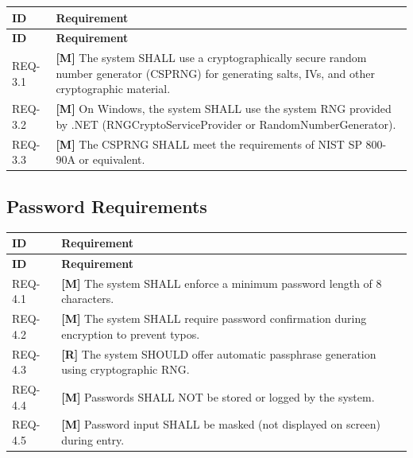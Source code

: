 \documentclass[11pt,letterpaper]{article}
\begin{document}
\begin{longtable}{@{}p{1.2cm}p{12cm}@{}}
\toprule
\textbf{ID} & \textbf{Requirement} \\
\midrule
\endfirsthead
\toprule
\textbf{ID} & \textbf{Requirement} \\
\midrule
\endhead

REQ-3.1 & \textcolor{mandatory}{\textbf{[M]}} The system SHALL use a cryptographically secure random number generator (CSPRNG) for generating salts, IVs, and other cryptographic material. \\[6pt]

REQ-3.2 & \textcolor{mandatory}{\textbf{[M]}} On Windows, the system SHALL use the system RNG provided by .NET (RNGCryptoServiceProvider or RandomNumberGenerator). \\[6pt]

REQ-3.3 & \textcolor{mandatory}{\textbf{[M]}} The CSPRNG SHALL meet the requirements of NIST SP 800-90A or equivalent. \\[6pt]

\bottomrule
\end{longtable}

\subsection{Password Requirements}

\begin{longtable}{@{}p{1.2cm}p{12cm}@{}}
\toprule
\textbf{ID} & \textbf{Requirement} \\
\midrule
\endfirsthead
\toprule
\textbf{ID} & \textbf{Requirement} \\
\midrule
\endhead

REQ-4.1 & \textcolor{mandatory}{\textbf{[M]}} The system SHALL enforce a minimum password length of 8 characters. \\[6pt]

REQ-4.2 & \textcolor{mandatory}{\textbf{[M]}} The system SHALL require password confirmation during encryption to prevent typos. \\[6pt]

REQ-4.3 & \textcolor{recommended}{\textbf{[R]}} The system SHOULD offer automatic passphrase generation using cryptographic RNG. \\[6pt]

REQ-4.4 & \textcolor{mandatory}{\textbf{[M]}} Passwords SHALL NOT be stored or logged by the system. \\[6pt]

REQ-4.5 & \textcolor{mandatory}{\textbf{[M]}} Password input SHALL be masked (not displayed on screen) during entry. \\[6pt]

\bottomrule
\end{longtable}
\end{document}
